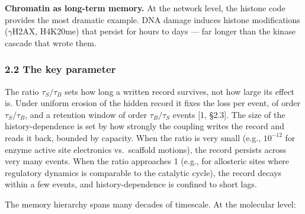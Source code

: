 \documentclass[
]{article}
\begin{document}
\textbf{Chromatin as long-term memory.} At the network level, the
histone code provides the most dramatic example. DNA damage induces
histone modifications (\(\gamma\)H2AX, H4K20me) that persist for hours
to days --- far longer than the kinase cascade that wrote them.

\hypertarget{the-key-parameter}{%
\subsubsection{2.2 The key parameter}\label{the-key-parameter}}

The ratio \(\tau_S / \tau_B\) sets how long a written record survives,
not how large its effect is. Under uniform erosion of the hidden record
it fixes the loss per event, of order \(\tau_S / \tau_B\), and a
retention window of order \(\tau_B / \tau_S\) events {[}1, §2.3{]}. The
size of the history-dependence is set by how strongly the coupling
writes the record and reads it back, bounded by capacity. When the ratio
is very small (e.g., \(10^{-12}\) for enzyme active site electronics
vs.~scaffold motions), the record persists across very many events. When
the ratio approaches 1 (e.g., for allosteric sites where regulatory
dynamics is comparable to the catalytic cycle), the record decays within
a few events, and history-dependence is confined to short lags.

The memory hierarchy spans many decades of timescale. At the molecular
level:
\end{document}
